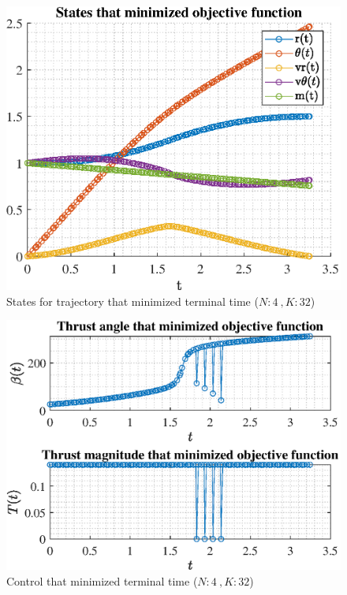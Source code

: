 \documentclass[]{article}
\begin{document}
\begin{figure}
	\centering
	\includegraphics[scale=0.75]{states_N4_K32_C3_tf.eps}
	\caption{States for trajectory that minimized terminal time (\(N:4\ , K:32\))}
	\label{fig:states_N4_K32_C3_tf}
\end{figure}
\begin{figure}
	\centering
	\includegraphics[scale=0.75]{control_N4_K32_C3_tf.eps}
	\caption{Control that minimized terminal time (\(N:4\ , K:32\))}
	\label{fig:control_N4_K32_C3_tf}
\end{figure}
\end{document}
